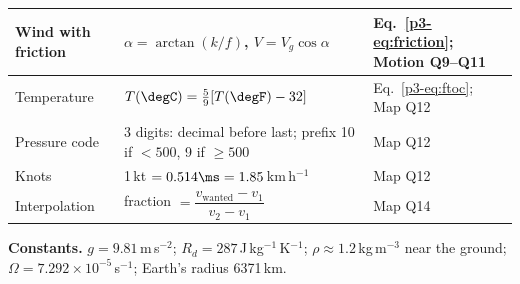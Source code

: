 \begin{table}[ht]
\begin{tabularx}{\textwidth}{@{}p{3.5cm}Xp{3cm}@{}}
Wind with friction & $\alpha=\arctan(k/f)$, $V=V_g\cos\alpha$ & Eq.~\eqref{p3-eq:friction}; Motion Q9--Q11\\
\midrule
Temperature & $T(\degC)=\tfrac59[T(\degF)-32]$ & Eq.~\eqref{p3-eq:ftoc}; Map Q12\\
Pressure code & 3 digits: decimal before last; prefix 10 if $<500$, 9 if $\ge500$ & Map Q12\\
Knots & 1\,kt $=0.514\ms=1.85$\,km\,h$^{-1}$ & Map Q12\\
Interpolation & fraction $=\dfrac{v_{\mathrm{wanted}}-v_1}{v_2-v_1}$ & Map Q14\\
\bottomrule
\end{tabularx}
\end{table}

\textbf{Constants.} $g=9.81$\,m\,s$^{-2}$; $R_d=287$\,J\,kg$^{-1}$\,K$^{-1}$; $\rho\approx1.2$\,kg\,m$^{-3}$ near the ground; $\Omega=7.292\times10^{-5}$\,s$^{-1}$; Earth's radius 6371\,km.
